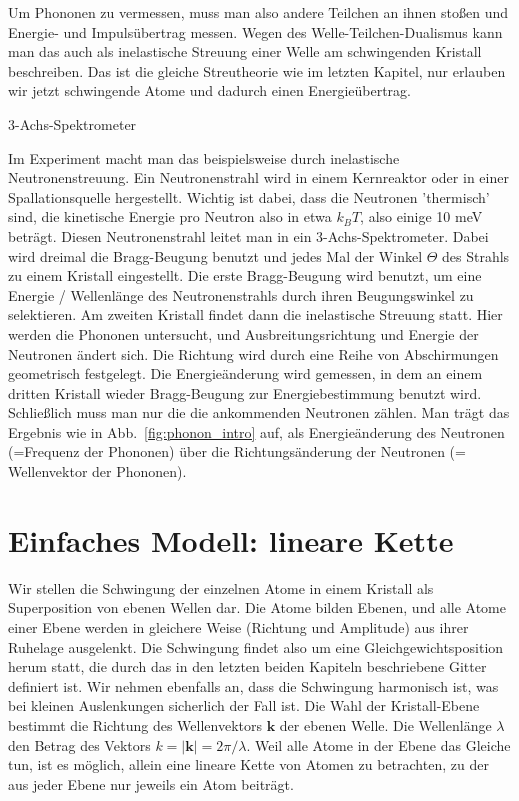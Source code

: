 Um Phononen zu vermessen, muss man also andere Teilchen an ihnen stoßen und Energie- und Impulsübertrag messen. Wegen des Welle-Teilchen-Dualismus kann man das auch als inelastische Streuung einer Welle am schwingenden Kristall beschreiben. Das ist die gleiche Streutheorie wie im letzten Kapitel, nur erlauben wir jetzt schwingende Atome und dadurch einen Energieübertrag.

\begin{marginfigure}
\caption{3-Achs-Spektrometer}

\end{marginfigure}

Im Experiment macht man das beispielsweise durch inelastische Neutronenstreuung. Ein Neutronenstrahl wird in einem Kernreaktor oder in einer Spallationsquelle  hergestellt. Wichtig ist dabei, dass die Neutronen 'thermisch' sind, die kinetische Energie pro  Neutron also in etwa $k_B T$, also einige 10 meV beträgt. Diesen Neutronenstrahl leitet man in ein 3-Achs-Spektrometer. Dabei wird dreimal die Bragg-Beugung benutzt und jedes Mal der Winkel $\Theta$ des Strahls zu einem Kristall eingestellt. Die erste Bragg-Beugung wird benutzt, um eine Energie / Wellenlänge des Neutronenstrahls durch ihren Beugungswinkel zu selektieren. Am zweiten Kristall findet dann die inelastische Streuung statt. Hier werden die Phononen untersucht, und Ausbreitungsrichtung und Energie der Neutronen ändert sich. Die Richtung wird durch eine Reihe von Abschirmungen geometrisch festgelegt. Die Energieänderung wird gemessen, in dem an einem dritten Kristall wieder Bragg-Beugung zur Energiebestimmung benutzt wird. Schließlich muss man nur die die ankommenden Neutronen zählen. Man trägt das Ergebnis wie in Abb.~\ref{fig:phonon_intro} auf, als Energieänderung des Neutronen (=Frequenz der Phononen) über die Richtungsänderung der Neutronen (= Wellenvektor der Phononen).

\section{Einfaches Modell: lineare Kette}

Wir stellen die Schwingung der einzelnen Atome in einem Kristall als Superposition von ebenen Wellen dar. Die Atome bilden Ebenen, und alle Atome einer Ebene werden in gleichere Weise (Richtung und Amplitude) aus ihrer Ruhelage ausgelenkt. Die Schwingung findet also um eine Gleichgewichtsposition herum statt, die durch das in den letzten beiden Kapiteln beschriebene Gitter definiert ist. Wir nehmen ebenfalls an, dass die Schwingung harmonisch ist, was bei kleinen Auslenkungen sicherlich der Fall ist. Die Wahl der Kristall-Ebene bestimmt die Richtung des Wellenvektors $\mathbf{k}$ der ebenen Welle. Die Wellenlänge $\lambda$ den Betrag des Vektors $k = |\mathbf{k}| = 2 \pi / \lambda$. Weil alle Atome in der Ebene das Gleiche tun, ist es möglich, allein eine lineare Kette von Atomen zu betrachten, zu der aus jeder Ebene nur jeweils ein Atom beiträgt.

